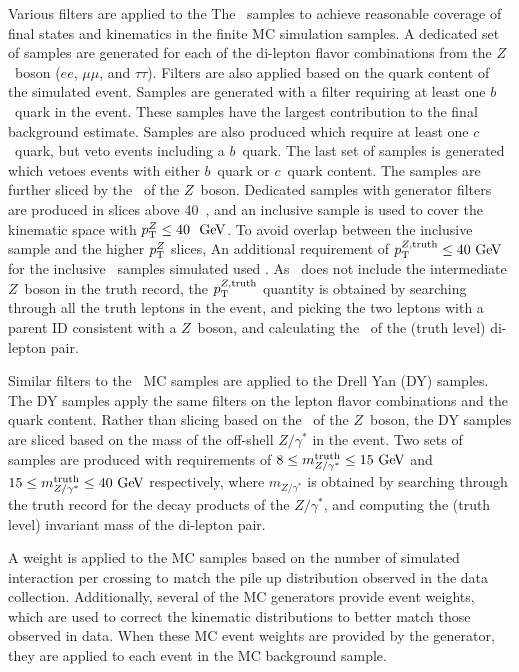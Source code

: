 Various filters are applied to the The \ZGAMMAJETS\ samples to achieve
reasonable coverage of final states and kinematics in the finite MC simulation
samples.
A dedicated set of samples are generated for each of the di-lepton flavor
combinations from the $Z$~boson ($ee$, $\mu\mu$, and $\tau\tau$).
Filters are also applied based on the quark content of the simulated event.
Samples are generated with a filter requiring at least one $b$~quark in the
event.
These samples have the largest contribution to the final background estimate.
Samples are also produced which require at least one $c$~quark, but veto events
including a $b$~quark.
The last set of samples is generated which vetoes events with either $b$~quark
or $c$~quark content.
The samples are further sliced by the \pt\ of the $Z$~boson.
Dedicated samples with generator filters are produced in slices above 40~\GeV,
and an inclusive sample is used to cover the kinematic space with
$\pt^{Z} \leq 40~\GeV$.
To avoid overlap between the inclusive sample and the higher $p_{\mathrm{T}}^{Z}$ slices,
An additional requirement of $\pt^{Z,\mathrm{truth}} \leq 40 \GeV$ for the
inclusive \ZGAMMAJETS\ samples simulated used \sherpa.
As \sherpa\ does not include the intermediate $Z$~boson in the truth record,
the $p_{\mathrm{T}}^{Z,\mathrm{truth}}$ quantity is obtained by searching through all the
truth leptons in the event, and picking the two leptons with a parent ID
consistent with a $Z$~boson, and calculating the \pt\ of the (truth level) 
di-lepton pair.

Similar filters to the \ZGAMMAJETS\ MC samples are applied to the Drell Yan (DY)
samples.
The DY samples apply the same filters on the lepton flavor combinations
and the quark content.
Rather than slicing based on the \pt\ of the $Z$~boson, the DY samples are
sliced based on the mass of the off-shell $Z/\gamma^{*}$ in the event.
Two sets of samples are produced with requirements of
$8 \leq m_{Z/\gamma^{*}}^\mathrm{truth} \leq 15 \GeV$ and 
$15 \leq m_{Z/\gamma^{*}}^\mathrm{truth} \leq 40 \GeV$ respectively, where
$m_{Z/\gamma^{*}}$ is obtained by searching through the truth record for the
decay products of the $Z/\gamma^{*}$, and computing the (truth level) invariant
mass of the di-lepton pair.

A weight is applied to the MC samples based on the number of simulated
interaction per crossing to match the pile up distribution observed in the
data collection.
Additionally, several of the MC generators provide event weights, which are
used to correct the kinematic distributions to better match those observed in
data.
When these MC event weights are provided by the generator, they are applied to
each event in the MC background sample.

